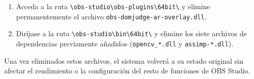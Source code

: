 \begin{enumerate}
    \item Acceda a la ruta \texttt{\textbackslash obs-studio\textbackslash obs-plugins\textbackslash 64bit\textbackslash} y elimine permanentemente el archivo \texttt{obs-domjudge-ar-overlay.dll}.
    \item Diríjase a la ruta \texttt{\textbackslash obs-studio\textbackslash bin\textbackslash 64bit\textbackslash} y elimine los siete archivos de dependencias previamente añadidos (\texttt{opencv\_*.dll} y \texttt{assimp-*.dll}).
\end{enumerate}

Una vez eliminados estos archivos, el sistema volverá a su estado original sin afectar el rendimiento o la configuración del resto de funciones de OBS Studio.